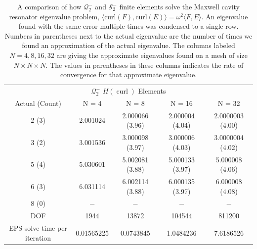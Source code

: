 \documentclass[format=acmsmall,screen,timestamp=false,a4paper]{acmart}
\DeclareMathOperator{\curl}{curl}
\newcommand{\hcurl}{\ensuremath{{H}(\curl)}\xspace}
\begin{document}
\begin{table}[htbp]
  \centering
  \caption{A comparison of how $ \mathcal{Q}^-_2$ and $\mathcal{S}^-_2$ finite elements solve the Maxwell cavity resonator eigenvalue problem, $\langle \text{curl}(F), \text{curl}(E) \rangle = \omega^2 \langle F, E \rangle$. An eigenvalue found with the same error multiple times was condensed to a single row.  Numbers in parentheses next to the actual eigenvalue are the number of times we found an approximation of the actual eigenvalue.  The columns labeled $N=4, 8, 16, 32$ are giving the approximate eigenvalues found on a mesh of size $N \times N \times N$.  The values in parentheses in these columns indicates the rate of convergence for that approximate eigenvalue.\label{tab:Eigenvalue}}
  \begin{tabular}{ c c c c c }
    \toprule
\multicolumn{5}{c}{$\mathcal{Q}^-_2$ \hcurl Elements} \\[0.3em]
Actual (Count) & N = 4 & N = 8 & N = 16 & N = 32 \\ 
\midrule
2 (3) &2.001024 & 2.000066 (3.96) & 2.000004 (4.04) & 2.0000003 (4.00) \\  
3 (2) & 3.001536 & 3.000098 (3.97) & 3.000006 (4.03) & 3.0000004 (4.02) \\
5 (4) & 5.030601 & 5.002081 (3.88)& 5.000133 (3.97) & 5.000008 (4.06) \\
6 (3) & 6.031114 & 6.002114 (3.88) & 6.000135 (3.97) &  6.000008 (4.08) \\
8 (0) & $-$ & $-$ & $-$ & $-$ \\
\midrule
DOF  & 1944 & 13872 & 104544 & 811200 \\
\midrule
EPS solve time per iteration & 0.01565225 & 0.0743845 & 1.0484236 & 7.6186526 \\
\bottomrule
\end{tabular} \\[\baselineskip]


\end{table}
\end{document}
